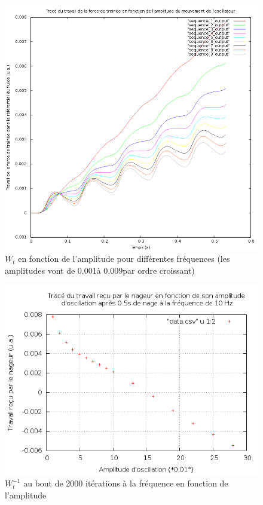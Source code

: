 		\begin{figure}[htbp]\begin{center}
			\includegraphics[width=0.9 \textwidth]{9courbes.png}
			\caption{$W_t$ en fonction de l'amplitude pour différentes
              fréquences (les amplitudes vont de 0.001\degre à 0.009\degre par
              ordre croissant)}
			\label{multiW}
		\end{center}\end{figure}				
		
		\begin{figure}[htbp]\begin{center}
			\includegraphics[width=0.9 \textwidth]{bcp_points.png}
			\caption{$W_t^{-1}$ au bout de 2000 itérations à la fréquence en fonction de l'amplitude}
			\label{Wamp}
		\end{center}\end{figure}
		
